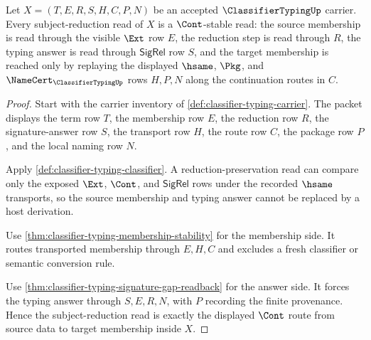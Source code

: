 \begin{theorem}
\label{thm:classifiertyping-subject-reduction-cont-stability}
Let $X=(T,E,R,S,H,C,P,N)$ be an accepted $\ClassifierTypingUp$ carrier. Every subject-reduction read of $X$ is a $\Cont$-stable read: the source membership is read through the visible $\Ext$ row $E$, the reduction step is read through $R$, the typing answer is read through $\mathsf{SigRel}$ row $S$, and the target membership is reached only by replaying the displayed $\hsame$, $\Pkg$, and $\NameCert_{\ClassifierTypingUp}$ rows $H,P,N$ along the continuation routes in $C$.
\end{theorem}
\begin{proof}
Start with the carrier inventory of \autoref{def:classifier-typing-carrier}. The packet displays the term row $T$, the membership row $E$, the reduction row $R$, the signature-answer row $S$, the transport row $H$, the route row $C$, the package row $P$, and the local naming row $N$.

Apply \autoref{def:classifier-typing-classifier}. A reduction-preservation read can compare only the exposed $\Ext$, $\Cont$, and $\mathsf{SigRel}$ rows under the recorded $\hsame$ transports, so the source membership and typing answer cannot be replaced by a host derivation.

Use \autoref{thm:classifier-typing-membership-stability} for the membership side. It routes transported membership through $E,H,C$ and excludes a fresh classifier or semantic conversion rule.

Use \autoref{thm:classifier-typing-signature-gap-readback} for the answer side. It forces the typing answer through $S,E,R,N$, with $P$ recording the finite provenance. Hence the subject-reduction read is exactly the displayed $\Cont$ route from source data to target membership inside $X$.
\end{proof}

